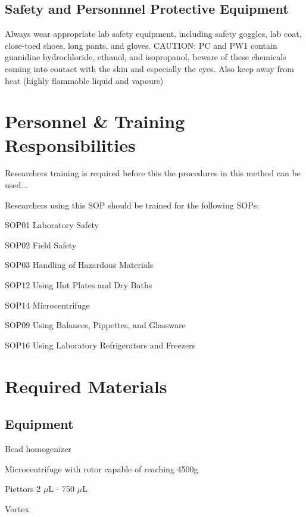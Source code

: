 \documentclass[12pt]{../SOP3_alpha}
\begin{document}
\subsection {Safety and Personnnel Protective Equipment}

Always wear appropriate lab safety equipment, including safety goggles, lab coat, close-toed shoes, long pants, and gloves. 
CAUTION: PC and PW1 contain guanidine hydrochloride, ethanol, and isopropanol, beware of these chemicals coming into contact with the skin and especially the eyes. Also keep away from heat (highly flammable liquid and vapours)


\section{Personnel \& Training Responsibilities}

\NP Researchers training is required before this the procedures in this method can be used... 

\NP Researchers using this SOP should be trained for the following SOPs:

\begin{itemize*}
  \item SOP01 Laboratory Safety
  \item SOP02 Field Safety
  \item SOP03 Handling of Hazardous Materials
  \item SOP12 Using Hot Plates and Dry Baths
  \item SOP14 Microcentrifuge
  \item SOP09 Using Balances, Pippettes, and Glassware
  \item SOP16 Using Laboratory Refrigerators and Freezers
\end{itemize*}

\section{Required Materials}

\subsection*{Equipment}

\NP Bead homogenizer

\NP Microcentrifuge with rotor capable of reaching 4500g

\NP Piettors 2 $\mu$L - 750 $\mu$L

\NP Vortex
\end{document}
